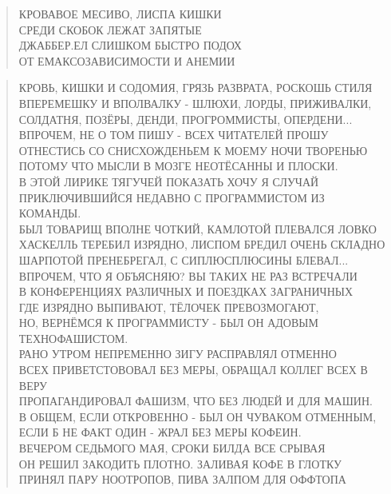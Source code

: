 \poemtitle{***}
\begin{verse}
КРОВАВОЕ МЕСИВО, ЛИСПА КИШКИ\\
СРЕДИ СКОБОК ЛЕЖАТ ЗАПЯТЫЕ\\
ДЖАББЕР.ЕЛ СЛИШКОМ БЫСТРО ПОДОХ\\
ОТ ЕМАКСОЗАВИСИМОСТИ И АНЕМИИ
\end{verse}

\poemtitle{***}
\begin{verse}
КРОВЬ, КИШКИ И СОДОМИЯ, ГРЯЗЬ РАЗВРАТА, РОСКОШЬ СТИЛЯ\\
ВПЕРЕМЕШКУ И ВПОЛВАЛКУ - ШЛЮХИ, ЛОРДЫ, ПРИЖИВАЛКИ,\\
СОЛДАТНЯ, ПОЗЁРЫ, ДЕНДИ, ПРОГРОММИСТЫ, ОПЕРДЕНИ...\\
ВПРОЧЕМ, НЕ О ТОМ ПИШУ - ВСЕХ ЧИТАТЕЛЕЙ ПРОШУ\\
ОТНЕСТИСЬ СО СНИСХОЖДЕНЬЕМ К МОЕМУ НОЧИ ТВОРЕНЬЮ\\
ПОТОМУ ЧТО МЫСЛИ В МОЗГЕ НЕОТЁСАННЫ И ПЛОСКИ.\\
В ЭТОЙ ЛИРИКЕ ТЯГУЧЕЙ ПОКАЗАТЬ ХОЧУ Я СЛУЧАЙ\\
ПРИКЛЮЧИВШИЙСЯ НЕДАВНО С ПРОГРАММИСТОМ ИЗ КОМАНДЫ.\\
БЫЛ ТОВАРИЩ ВПОЛНЕ ЧОТКИЙ, КАМЛОТОЙ ПЛЕВАЛСЯ ЛОВКО\\
ХАСКЕЛЛЬ ТЕРЕБИЛ ИЗРЯДНО, ЛИСПОМ БРЕДИЛ ОЧЕНЬ СКЛАДНО\\
ШАРПОТОЙ ПРЕНЕБРЕГАЛ, С СИПЛЮСПЛЮСИНЫ БЛЕВАЛ...\\
ВПРОЧЕМ, ЧТО Я ОБЪЯСНЯЮ? ВЫ ТАКИХ НЕ РАЗ ВСТРЕЧАЛИ\\
В КОНФЕРЕНЦИЯХ РАЗЛИЧНЫХ И ПОЕЗДКАХ ЗАГРАНИЧНЫХ\\
ГДЕ ИЗРЯДНО ВЫПИВАЮТ, ТЁЛОЧЕК ПРЕВОЗМОГАЮТ,\\
НО, ВЕРНЁМСЯ К ПРОГРАММИСТУ - БЫЛ ОН АДОВЫМ ТЕХНОФАШИСТОМ.\\
РАНО УТРОМ НЕПРЕМЕННО ЗИГУ РАСПРАВЛЯЛ ОТМЕННО\\
ВСЕХ ПРИВЕТСТОВОВАЛ БЕЗ МЕРЫ, ОБРАЩАЛ КОЛЛЕГ ВСЕХ В ВЕРУ\\
ПРОПАГАНДИРОВАЛ ФАШИЗМ, ЧТО БЕЗ ЛЮДЕЙ И ДЛЯ МАШИН.\\
В ОБЩЕМ, ЕСЛИ ОТКРОВЕННО - БЫЛ ОН ЧУВАКОМ ОТМЕННЫМ,\\
ЕСЛИ Б НЕ ФАКТ ОДИН - ЖРАЛ БЕЗ МЕРЫ КОФЕИН.\\
ВЕЧЕРОМ СЕДЬМОГО МАЯ, СРОКИ БИЛДА ВСЕ СРЫВАЯ\\
ОН РЕШИЛ ЗАКОДИТЬ ПЛОТНО. ЗАЛИВАЯ КОФЕ В ГЛОТКУ\\
ПРИНЯЛ ПАРУ НООТРОПОВ, ПИВА ЗАЛПОМ ДЛЯ ОФФТОПА\\

\end{verse}
